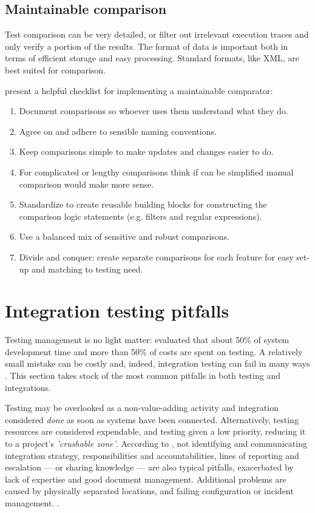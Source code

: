 \documentclass[12pt,a4paper,oneside,pdftex]{report}
\begin{document}
\subsection{Maintainable comparison} 

Test comparison can be very detailed, or filter out irrelevant execution traces and only verify a portion of the results. The format of data is important both in terms of efficient storage and easy processing. Standard formats, like XML, are best suited for comparison.

\citet{fewster1999software} present a helpful checklist for implementing a maintainable comparator:
\begin{enumerate}
\item Document comparisons so whoever uses them understand what they do.
\item Agree on and adhere to sensible naming conventions.
\item Keep comparisons simple to make updates and changes easier to do. 
\item For complicated or lengthy comparisons think if can be simplified manual comparison would make more sense.
\item Standardize to create reusable building blocks for constructing the comparison logic statements (e.g. filters and regular expressions). 
\item Use a balanced mix of sensitive and robust comparisons.
\item Divide and conquer: create separate comparisons for each feature for easy set-up and matching to testing need.
\end{enumerate}


\section{Integration testing pitfalls}
\label{section:pitfalls}

Testing management is no light matter: \citet{reid2005art} evaluated that about 50\% of system development time and more than 50\% of costs are spent on testing. A relatively small mistake can be costly and, indeed, integration testing can fail in many ways \citep{van2008identifying}. This section takes stock of the most common pitfalls in both testing and integrations.

Testing may be overlooked as a non-value-adding activity and integration considered \emph{done} as soon as systems have been connected. Alternatively, testing resources are considered expendable, and testing given a low priority, reducing it to a project's \emph{'crushable zone'}. According to \citet{van2008identifying}, not identifying and communicating integration strategy, responsibilities and accountabilities, lines of reporting and escalation --- or sharing knowledge --- are also typical pitfalls, exacerbated by lack of expertise and good document management. Additional problems are caused by physically separated locations, and failing configuration or incident management. \citep{van2008identifying}.
\end{document}
